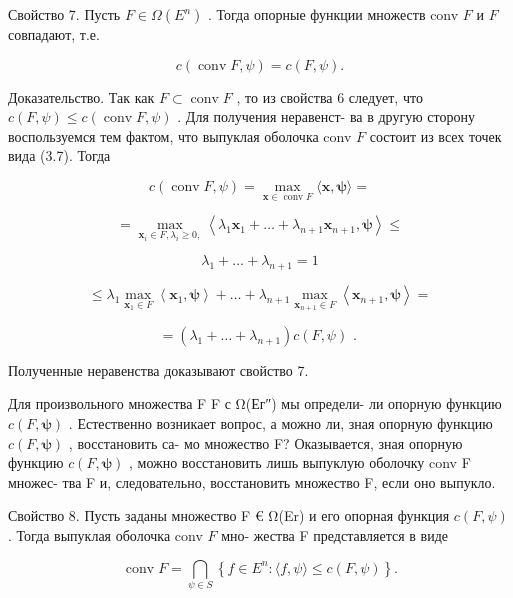 \documentclass[8pt]{extarticle}
\begin{document}
Свойство 7. Пусть \(F \in  \Omega \left( {E}^{n}\right)\) . Тогда опорные функции множеств conv \(F\) и \(F\) совпадают, т.е.

\[
c\left( {\operatorname{conv}F,\psi }\right)  = c\left( {F,\psi }\right) .
\]

Доказательство. Так как \(F \subset  \operatorname{conv}F\) , то из свойства 6 следует, что \(c\left( {F,\psi }\right)  \leq  c\left( {\operatorname{conv}F,\psi }\right)\) . Для получения неравенст- ва в другую сторону воспользуемся тем фактом, что выпуклая оболочка conv \(F\) состоит из всех точек вида (3.7). Тогда

\[
c\left( {\operatorname{conv}F,\psi }\right)  = \mathop{\max }\limits_{{\mathbf{x} \in  \operatorname{conv}F}}\langle \mathbf{x},\mathbf{\psi }\rangle  =
\]

\[
= \mathop{\max }\limits_{{{\mathbf{x}}_{i} \in  F,{\lambda }_{i} \geq  0,}}\left\langle  {{\lambda }_{1}{\mathbf{x}}_{1} + \ldots  + {\lambda }_{n + 1}{\mathbf{x}}_{n + 1},\mathbf{\psi }}\right\rangle   \leq
\]

\[
{\lambda }_{1} + \ldots  + {\lambda }_{n + 1} = 1
\]

\[
\leq  {\lambda }_{1}\mathop{\max }\limits_{{{\mathbf{x}}_{1} \in  F}}\left\langle  {{\mathbf{x}}_{1},\mathbf{\psi }}\right\rangle   + \ldots  + {\lambda }_{n + 1}\mathop{\max }\limits_{{{\mathbf{x}}_{n + 1} \in  F}}\left\langle  {{\mathbf{x}}_{n + 1},\mathbf{\psi }}\right\rangle   =
\]

\[
= \left( {{\lambda }_{1} + \ldots  + {\lambda }_{n + 1}}\right) c\left( {F,\psi }\right) \text{ . }
\]

Полученные неравенства доказывают свойство 7.

Для произвольного множества F F с Ω(Ег″) мы определи- ли опорную функцию \(c\left( {F,\mathbf{\psi }}\right)\) . Естественно возникает вопрос, а можно ли, зная опорную функцию \(c\left( {F,\mathbf{\psi }}\right)\) , восстановить са- мо множество F? Оказывается, зная опорную функцию \(c\left( {F,\mathbf{\psi }}\right)\) , можно восстановить лишь выпуклую оболочку conv F множес- тва F и, следовательно, восстановить множество F, если оно выпукло.

Свойство 8. Пусть заданы множество F € Ω(Er) и его опорная функция \(c\left( {F,\psi }\right)\) . Тогда выпуклая оболочка conv \(F\) мно- жества F представляется в виде

\[
\operatorname{conv}F = \mathop{\bigcap }\limits_{{\psi  \in  S}}\left\{  {f \in  {E}^{n} : \langle f,\psi \rangle  \leq  c\left( {F,\psi }\right) }\right\}  . \tag{3.10}
\]
\end{document}
